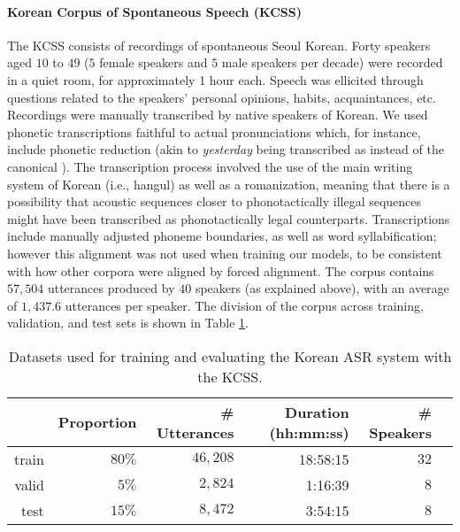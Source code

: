 \paragraph{Korean Corpus of Spontaneous Speech (KCSS)}

The KCSS \cite{yun2015} consists of recordings of spontaneous Seoul Korean. Forty speakers aged $10$ to $49$ ($5$ female speakers and $5$ male speakers per decade) were recorded in a quiet room, for approximately 1 hour each. Speech was ellicited through questions related to the speakers' personal opinions, habits, acquaintances, etc.      
Recordings were manually transcribed by native speakers of Korean. We used phonetic transcriptions faithful to actual pronunciations which, for instance, include phonetic reduction (akin to \textit{yesterday} being transcribed as  instead of the canonical ). The transcription process involved the use of the main writing system of Korean (i.e., hangul) as well as a romanization, meaning that there is a possibility that acoustic sequences closer to phonotactically illegal sequences might have been transcribed as phonotactically legal counterparts.   
Transcriptions include manually adjusted phoneme boundaries, as well as word syllabification; however this alignment was not used when training our models, %
to be consistent with how other corpora were aligned by forced alignment.
The corpus contains $57,504$ utterances produced by $40$ speakers (as explained above), with an average of $1,437.6$ utterances per speaker. The division of the corpus across training, validation, and test sets is shown in Table \ref{tab:hmm_kcss}.

\begin{table}[htb]
\centering
\caption{Datasets used for training and evaluating the Korean ASR system with the KCSS.}
\label{tab:hmm_kcss}
\vspace{0.25cm}
\begin{tabular}{rrrrrr}
  \toprule
      & Proportion & \# Utterances & Duration (hh:mm:ss) & \# Speakers &  \\ \midrule
  train & $80\%$ &  $46,208$ &   18:58:15   &   $32$    &  \\
  valid & $5\%$ &  $2,824$ &  1:16:39  &  $8$  &  \\
  test  & $15\%$ &  $8,472$ & 3:54:15   & $8$    & \\ \bottomrule
\end{tabular}
\end{table}

